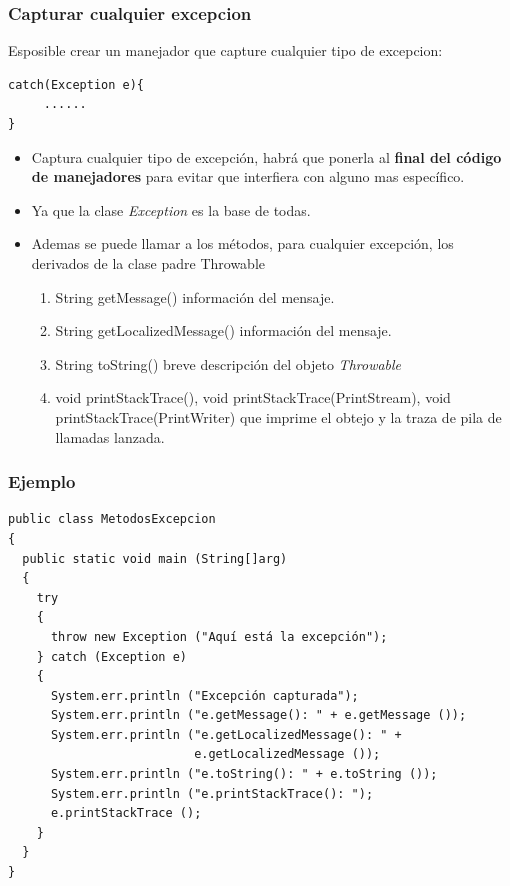 \documentclass{beamer}
\begin{document}
\begin{frame}[fragile]
\frametitle{Capturar cualquier excepcion}
Esposible crear un manejador que capture cualquier tipo de excepcion:
\begin{verbatim}
catch(Exception e){
     ......
}
\end{verbatim}
\begin{itemize}[<+->]
\item Captura cualquier tipo de excepción, habrá que ponerla al \textbf{final del código de manejadores} para evitar que interfiera con alguno mas específico.
\item Ya que la clase \emph{Exception} es la base de todas.
\item Ademas se puede llamar a los métodos, para cualquier excepción, los derivados de la clase padre \alert{Throwable}
\begin{enumerate}
\item \alert{String getMessage()} información del mensaje.
\item \alert{String getLocalizedMessage()} información del mensaje.
\item \alert{String toString()} breve descripción del objeto \emph{Throwable}
\item \alert{void printStackTrace(), void printStackTrace(PrintStream), void printStackTrace(PrintWriter)} que imprime el obtejo y la traza de pila de llamadas lanzada.
\end{enumerate}
\end{itemize}
\end{frame}

\begin{frame}[fragile]
\frametitle{Ejemplo}
\begin{small}
\begin{verbatim}
public class MetodosExcepcion
{
  public static void main (String[]arg)
  {
    try
    {
      throw new Exception ("Aquí está la excepción");
    } catch (Exception e)
    {
      System.err.println ("Excepción capturada");
      System.err.println ("e.getMessage(): " + e.getMessage ());
      System.err.println ("e.getLocalizedMessage(): " +
                          e.getLocalizedMessage ());
      System.err.println ("e.toString(): " + e.toString ());
      System.err.println ("e.printStackTrace(): ");
      e.printStackTrace ();
    }
  }
}
\end{verbatim}
\end{small}
\end{frame}
\end{document}
